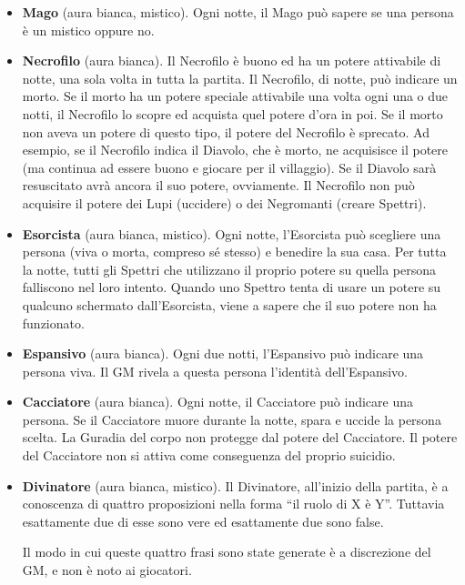 \documentclass[a4paper,10pt]{article}
\begin{document}
\begin{itemize}
 \item {\bf Mago} (aura bianca, mistico). Ogni notte, il Mago può sapere se una persona è un mistico oppure no.
 

 \item {\bf Necrofilo} (aura bianca). Il Necrofilo è buono ed ha un potere attivabile di notte, una sola volta in tutta la partita.
Il Necrofilo, di notte, può indicare un morto. Se il morto ha un potere speciale attivabile una volta ogni una o due notti, il Necrofilo lo scopre ed acquista quel potere d’ora in poi. Se il morto non aveva un potere di questo tipo, il potere del Necrofilo è sprecato. Ad esempio, se il Necrofilo indica il Diavolo, che è morto, ne acquisisce il potere (ma continua ad essere buono e giocare per il villaggio). Se il Diavolo sarà resuscitato avrà ancora il suo potere, ovviamente.
Il Necrofilo non può acquisire il potere dei Lupi (uccidere) o dei Negromanti (creare Spettri).

 \item {\bf Esorcista} (aura bianca, mistico). Ogni notte, l'Esorcista può scegliere una persona (viva o morta, compreso sé stesso) e benedire la sua casa.
 Per tutta la notte, tutti gli Spettri che utilizzano il proprio potere su quella persona falliscono nel loro intento.
 Quando uno Spettro tenta di usare un potere su qualcuno schermato dall'Esorcista, viene a sapere che il suo potere non ha funzionato.
 


 \item {\bf Espansivo} (aura bianca). Ogni due notti, l'Espansivo può indicare una persona viva. Il GM rivela a questa persona l'identità dell'Espansivo.

 \item {\bf Cacciatore} (aura bianca). Ogni notte, il Cacciatore può indicare una persona. Se il Cacciatore muore durante la notte, spara e uccide la persona scelta.
 La Guradia del corpo non protegge dal potere del Cacciatore.
 Il potere del Cacciatore non si attiva come conseguenza del proprio suicidio.

 \item {\bf Divinatore} (aura bianca, mistico). Il Divinatore, all'inizio della partita, è a conoscenza di quattro proposizioni nella forma ``il ruolo di X è Y''. Tuttavia esattamente due di esse sono vere ed esattamente due sono false.
 
 Il modo in cui queste quattro frasi sono state generate è a discrezione del GM, e non è noto ai giocatori.
 
\end{itemize}
\end{document}
